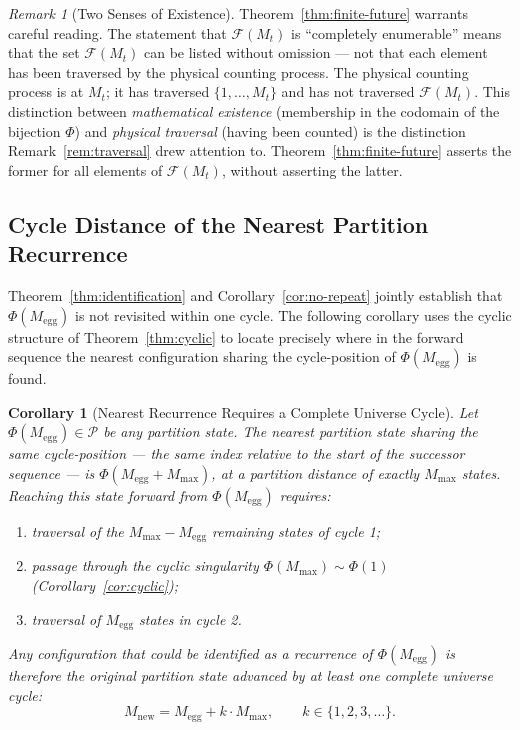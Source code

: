 \documentclass[twocolumn,10pt,a4paper]{article}
\theoremstyle{thmstyle}
\newtheorem{corollary}[theorem]{Corollary}
\theoremstyle{definition}
\theoremstyle{remark}
\newtheorem{remark}[theorem]{Remark}
\newcommand{\Parts}{\mathcal{P}}
\newcommand{\Mmax}{M_{\max}}
\newcommand{\PhiMap}{\varPhi}
\begin{document}
\begin{remark}[Two Senses of Existence]
\label{rem:two-senses}
Theorem~\ref{thm:finite-future} warrants careful reading. The statement that $\mathcal{F}(M_t)$ is ``completely enumerable'' means that the set $\mathcal{F}(M_t)$ can be listed without omission --- not that each element has been traversed by the physical counting process. The physical counting process is at $M_t$; it has traversed $\{1, \ldots, M_t\}$ and has not traversed $\mathcal{F}(M_t)$. This distinction between \emph{mathematical existence} (membership in the codomain of the bijection $\PhiMap$) and \emph{physical traversal} (having been counted) is the distinction Remark~\ref{rem:traversal} drew attention to. Theorem~\ref{thm:finite-future} asserts the former for all elements of $\mathcal{F}(M_t)$, without asserting the latter.
\end{remark}

\subsection{Cycle Distance of the Nearest Partition Recurrence}
\label{sec:cycle-distance}

Theorem~\ref{thm:identification} and Corollary~\ref{cor:no-repeat} jointly establish that $\PhiMap(M_{\mathrm{egg}})$ is not revisited within one cycle. The following corollary uses the cyclic structure of Theorem~\ref{thm:cyclic} to locate precisely where in the forward sequence the nearest configuration sharing the cycle-position of $\PhiMap(M_{\mathrm{egg}})$ is found.

\begin{corollary}[Nearest Recurrence Requires a Complete Universe Cycle]
\label{cor:egg-cycle}
Let $\PhiMap(M_{\mathrm{egg}}) \in \Parts$ be any partition state. The nearest partition state sharing the same cycle-position --- the same index relative to the start of the successor sequence --- is $\PhiMap(M_{\mathrm{egg}} + \Mmax)$, at a partition distance of exactly $\Mmax$ states. Reaching this state forward from $\PhiMap(M_{\mathrm{egg}})$ requires:
\begin{enumerate}[leftmargin=1.5em,label=(\roman*),itemsep=0.1em]
\item traversal of the $\Mmax - M_{\mathrm{egg}}$ remaining states of cycle 1;
\item passage through the cyclic singularity $\PhiMap(\Mmax) \sim \PhiMap(1)$ (Corollary~\ref{cor:cyclic});
\item traversal of $M_{\mathrm{egg}}$ states in cycle 2.
\end{enumerate}
Any configuration that could be identified as a recurrence of $\PhiMap(M_{\mathrm{egg}})$ is therefore the original partition state advanced by at least one complete universe cycle:
\begin{equation}
    M_{\mathrm{new}} = M_{\mathrm{egg}} + k \cdot \Mmax, \qquad k \in \{1, 2, 3, \ldots\}.
    \label{eq:egg-cycle}
\end{equation}
\end{corollary}
\end{document}
